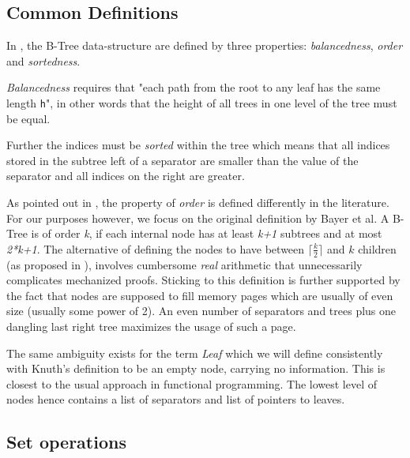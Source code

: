 \subsection{Common Definitions}

In \parencite{DBLP:journals/acta/BayerM72},
the B-Tree data-structure are defined by three properties: \textit{balancedness}, \textit{order} and \textit{sortedness}.

\textit{Balancedness} requires that "each path from the root to any leaf has the same length \texttt{h}",
in other words that the height of all trees in one level of the tree must be equal.

Further the indices must be \textit{sorted} within the tree which means that all indices stored
in the subtree left of a separator are smaller than the value of the separator
and all indices on the right are greater.

As pointed out in \parencite{DBLP:books/daglib/0095349_mod},
the property of \textit{order} is defined differently in the literature.
For our purposes however, we focus on the original definition by Bayer et al.
A B-Tree is of order \textit{k}, if each internal node has at least \textit{k+1}
subtrees and at most \textit{2*k+1}.
The alternative of defining the nodes to have between $\lceil \frac{k}{2} \rceil$
and $k$ children (as proposed in \parencite{DBLP:books/lib/Knuth98a}),
involves cumbersome \textit{real} arithmetic that unnecessarily complicates
mechanized proofs.
Sticking to this definition is further supported by the fact that nodes are supposed
to fill memory pages which are usually of even size (usually some power of 2).
An even number of separators and trees plus one dangling last right tree maximizes
the usage of such a page.

The same ambiguity exists for the term \textit{Leaf} which we will define consistently with Knuth's definition \parencite{DBLP:books/lib/Knuth98a}
to be an empty node, carrying no information.
This is closest to the usual approach in functional programming.
The lowest level of nodes hence contains a list of separators and
list of pointers to leaves.


\subsection{Set operations}

